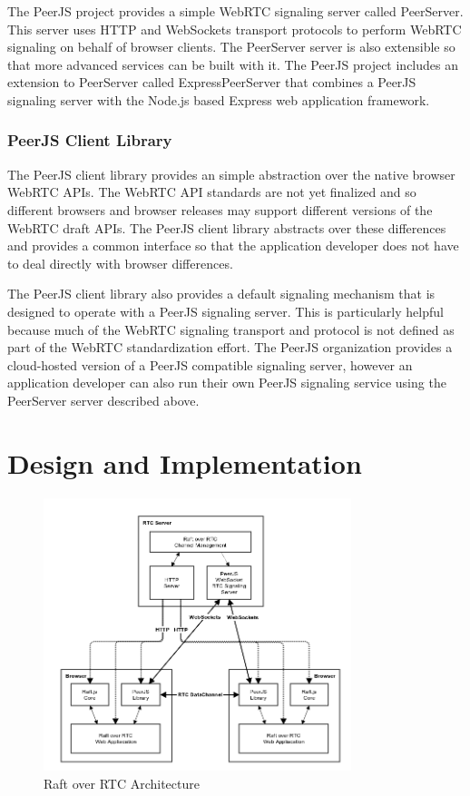 \documentclass[9pt]{extarticle}
\begin{document}
\begin{multicols}{2}
The PeerJS project provides a simple WebRTC signaling server called
PeerServer. This server uses HTTP and WebSockets transport protocols
to perform WebRTC signaling on behalf of browser clients. The
PeerServer server is also extensible so that more advanced services
can be built with it. The PeerJS project includes an extension to
PeerServer called ExpressPeerServer that combines a PeerJS signaling
server with the Node.js based Express web application framework.

\subsubsection{PeerJS Client Library}

The PeerJS client library provides an simple abstraction over the
native browser WebRTC APIs. The WebRTC API standards are not yet
finalized and so different browsers and browser releases may support
different versions of the WebRTC draft APIs. The PeerJS client library
abstracts over these differences and provides a common interface so
that the application developer does not have to deal directly with
browser differences.

The PeerJS client library also provides a default signaling mechanism
that is designed to operate with a PeerJS signaling server. This is
particularly helpful because much of the WebRTC signaling transport
and protocol is not defined as part of the WebRTC standardization
effort. The PeerJS organization provides a cloud-hosted version of
a PeerJS compatible signaling server, however an application developer
can also run their own PeerJS signaling service using the PeerServer
server described above.


\section {Design and Implementation}

\end{multicols}

\begin{figure}[h]
\centerline{\includegraphics[width=0.8\textwidth]{imgs/raft_rtc_architecture}}
\caption{Raft over RTC Architecture}
  \label{fig:raft_rtc_architecture}
\end{figure}
\end{document}
